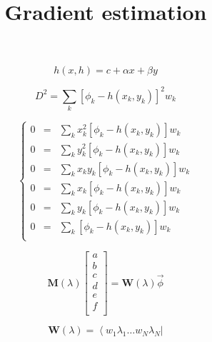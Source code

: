 \documentclass[aps,12pt]{revtex4}
\begin{document}
\title{Gradient estimation}
\maketitle

\begin{equation}
h(x,h) = c + \alpha x + \beta y
\end{equation}

\begin{equation}
	D^2 = \sum_k \left[ \phi_k - h(x_k,y_k)\right]^2 w_k
\end{equation}

\begin{equation}
\left\lbrace
\begin{array}{rcl}
0 & = & \displaystyle \sum_k x_k^2 \left[ \phi_k - h(x_k,y_k)\right] w_k \\
0 & = & \displaystyle \sum_k y_k^2 \left[ \phi_k - h(x_k,y_k)\right] w_k \\
0 & = & \displaystyle \sum_k x_k y_k \left[ \phi_k - h(x_k,y_k)\right] w_k \\
0 & = & \displaystyle \sum_k x_k  \left[ \phi_k - h(x_k,y_k)\right] w_k \\
0 & = & \displaystyle \sum_k y_k \left[ \phi_k - h(x_k,y_k)\right] w_k \\
0 & = & \displaystyle \sum_k \left[ \phi_k - h(x_k,y_k)\right] w_k \\
\end{array}
\right.
\end{equation}

\begin{equation}
	\bm{M}(\lambda)
	\begin{bmatrix}
	a\\
	b\\
	c\\
	d\\
	e\\
	f\\
	\end{bmatrix}
	= 
	\bm{W}(\lambda) \vec{\phi}
\end{equation}

\begin{equation}
\bm{W}(\lambda) = \left< w_1 \lambda_1 \ldots w_N \lambda_N \right|
\end{equation}
\end{document}
